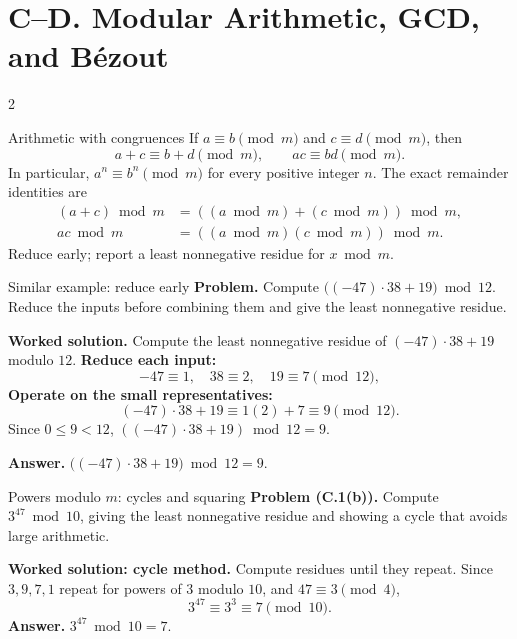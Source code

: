 \documentclass[10pt]{article}
\begin{document}
\thispagestyle{fancy}
\pagestyle{fancy}
\thispagestyle{fancy}
\clearpage
\section*{C--D. Modular Arithmetic, GCD, and B\'ezout}
\thispagestyle{fancy}

\begingroup
{}
\setlength{\abovedisplayskip}{3pt}
\setlength{\belowdisplayskip}{3pt}
\begin{multicols}{2}\small
\begin{definitionbox}{Arithmetic with congruences}
If $a\equiv b\pmod m$ and $c\equiv d\pmod m$, then
\[
a+c\equiv b+d\pmod m,
\qquad ac\equiv bd\pmod m.
\]
In particular, $a^n\equiv b^n\pmod m$ for every positive integer $n$.
The exact remainder identities are
\[
\begin{aligned}
(a+c)\bmod m&=((a\bmod m)+(c\bmod m))\bmod m,\\
ac\bmod m&=((a\bmod m)(c\bmod m))\bmod m.
\end{aligned}
\]
Reduce early; report a least nonnegative residue for $x\bmod m$.
\end{definitionbox}

\begin{workedbox}{Similar example: reduce early}
\textbf{Problem.} Compute $\bigl((-47)\cdot38+19\bigr)\bmod12$. Reduce the inputs before combining them and give the least nonnegative residue.

\textbf{Worked solution.} Compute the least nonnegative residue of $(-47)\cdot38+19$ modulo $12$.
\textbf{Reduce each input:}
\[
-47\equiv1,\quad38\equiv2,\quad19\equiv7\pmod{12},
\]
\textbf{Operate on the small representatives:}
\[
(-47)\cdot38+19\equiv1(2)+7\equiv9\pmod{12}.
\]
Since $0\le9<12$, $((-47)\cdot38+19)\bmod12=9$.

\textbf{Answer.} $\bigl((-47)\cdot38+19\bigr)\bmod12=9$.
\end{workedbox}

\begin{methodbox}{Powers modulo $m$: cycles and squaring}
\textbf{Problem (C.1(b)).} Compute $3^{47}\bmod10$, giving the least nonnegative residue and showing a cycle that avoids large arithmetic.

\textbf{Worked solution: cycle method.} Compute residues until they repeat. Since
$3,9,7,1$ repeat for powers of $3$ modulo $10$, and $47\equiv3\pmod4$,
\[
3^{47}\equiv3^3\equiv7\pmod{10}.
\]
\textbf{Answer.} $3^{47}\bmod10=7$.


\end{methodbox}
\end{multicols}
\end{document}
